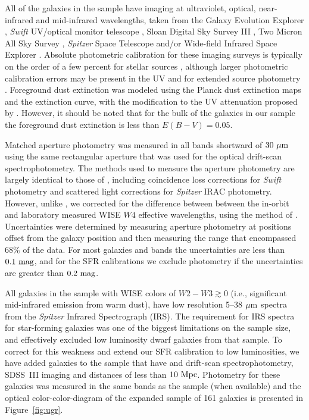 \documentclass[preprint]{aastex61}
\begin{document}
All of the galaxies in the sample have imaging at ultraviolet, optical, near-infrared and mid-infrared wavelengths, taken from the Galaxy Evolution Explorer \citep[GALEX;][]{mor07},  {\it Swift} UV/optical monitor telescope \citep[UVOT;][]{rom05}, Sloan Digital Sky Survey III \citep[SDSS III;][]{sdss3}, Two Micron All Sky Survey \citep[2MASS;][]{skr06}, {\it Spitzer} Space Telescope \citep{faz04,rie04} and/or Wide-field Infrared Space Explorer \citep[WISE;][]{wri10}. Absolute photometric calibration for these imaging surveys is typically on the order of a few percent for stellar sources \citep{skr06,pad08,wri10,boh11,boh14}, although larger photometric calibration errors may be present in the UV \citep[GALEX calibration issues are discussed in detail by][]{cam14} and for extended source photometry \citep[e.g.,][]{jar11}. Foreground dust extinction was modeled using the Planck dust extinction maps \citep{pla11,pla13} and the \cite{fit99} extinction curve, with the modification to the UV attenuation proposed by \citet{pee2013b}. However, it should be noted that for the bulk of the galaxies in our sample the foreground dust extinction is less than $E(B-V)=0.05$.  


Matched aperture photometry was measured in all bands shortward of $30~{\rm \mu m}$ using the same rectangular aperture that was used for the optical drift-scan spectrophotometry. The methods used to measure the aperture photometry are largely identical to those of \cite{bro14}, including coincidence loss corrections for {\it Swift} photometry and scattered light corrections for {\it Spitzer} IRAC photometry. However, unlike \cite{bro14}, we corrected for the difference between between the in-orbit and laboratory measured WISE $W4$ effective wavelengths, using the method of \citet{bro14b}. Uncertainties were determined by measuring aperture photometry at positions offset from the galaxy position and then measuring the range that encompassed 68\% of the data. For most galaxies and bands the uncertainties are less than $0.1~{\rm mag}$, and for the SFR calibrations we exclude photometry if the uncertainties are greater than $0.2~{\rm mag}$.

All galaxies in the \citet{bro14} sample with WISE colors of $W2-W3 \gtrsim 0$ (i.e., significant mid-infrared emission from warm dust), have low resolution 5--38$~{\rm \mu m}$ spectra from the {\it Spitzer} Infrared Spectrograph (IRS). The requirement for IRS spectra for star-forming galaxies was one of the biggest limitations on the \citet{bro14} sample size, and effectively excluded low luminosity dwarf galaxies from that sample. To correct for this weakness and extend our SFR calibration to low luminosities, we have added galaxies to the sample that have \citet{mou06} and \citet{mou10} drift-scan spectrophotometry, SDSS~III imaging and distances of less than $10~{\rm Mpc}$. Photometry for these galaxies was measured in the same bands as the \citet{bro14} sample (when available) and the optical color-color-diagram of the expanded sample of 161 galaxies is presented in Figure~\ref{fig:ugr}.
\end{document}
